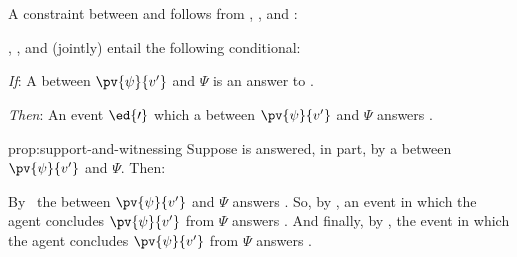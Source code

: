 \section{\issueConstraint{}}
\label{cha:var:issue}

\begin{note}
  A constraint between \qWhyV{} and \qHowV{} follows from \linkW{}, \linkH{}, and \issueInclusion{}:

  \begin{proposition}[\qWhyV{}-\qWhy{}-\qHow{}-\qHowV{}]%
    \label{prop:support-and-witnessing}%
    \linkW{}, \linkH{}, and \issueInclusion{} (jointly) entail the following conditional:
    \begin{itenum}
    \item[\emph{If}:]
      A \ros{} between \(\pv{\psi}{v'}\) and \(\Psi\) is an answer to \qWhyV{}.
    \item[\emph{Then}:]
      An event \(\ed{\prime}\) which  a \ros{} between \(\pv{\psi}{v'}\) and \(\Psi\) answers \qHowV{}.
    \end{itenum}
    \vspace{-\baselineskip}
  \end{proposition}

  \begin{argument}{prop:support-and-witnessing}
    Suppose \qWhyV{} is answered, in part, by a \ros{} between \(\pv{\psi}{v'}\) and \(\Psi\).
    Then:

    By~\linkW{} the \ros{} between \(\pv{\psi}{v'}\) and \(\Psi\) answers \qWhy{}.
    So, by \issueInclusion{}, an event in which the agent concludes \(\pv{\psi}{v'}\) from \(\Psi\) answers \qHow{}.
    And finally, by \linkH{}, the event in which the agent concludes \(\pv{\psi}{v'}\) from \(\Psi\) answers \qHowV{}.
  \end{argument}
\end{note}



